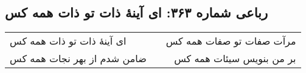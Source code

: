 \begin{center}
\section*{رباعی شماره ۳۶۳: ای آینهٔ ذات تو ذات همه کس}
\label{sec:sh363}
\begin{longtable}{l p{0.5cm} r}
ای آینهٔ ذات تو ذات همه کس
&&
مرآت صفات تو صفات همه کس
\\
ضامن شدم از بهر نجات همه کس
&&
بر من بنویس سیئات همه کس
\\
\end{longtable}
\end{center}
